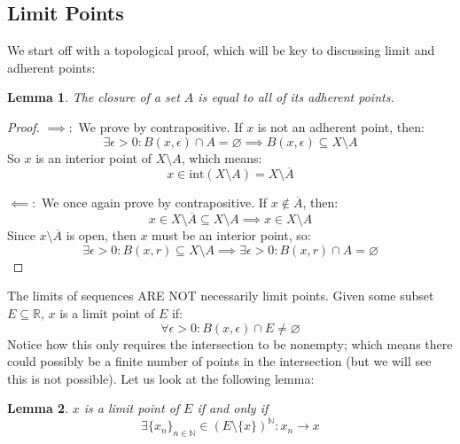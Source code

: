 \documentclass[10pt,letterpaper]{article} %
\newtheorem{lem}{Lemma}[section]
\begin{document}
\subsection{Limit Points}
We start off with a topological proof, which will be key to discussing limit and adherent points:
\begin{lem}
The closure of a set $A$ is equal to all of its adherent points. 
\end{lem}
\begin{proof}
$\implies:$ We prove by contrapositive. If $x$ is not an adherent point, then:
\begin{equation*}
\exists \epsilon > 0: B(x, \epsilon) \cap A = \varnothing \implies B(x, \epsilon) \subseteq X \setminus A
\end{equation*} 
So $x$ is an interior point of $X \setminus A$, which means:
\begin{equation*}
x \in \text{int}(X \setminus A) = X \setminus \overline{A}
\end{equation*} 

$\impliedby:$ We once again prove by contrapositive. If $x \notin \overline{A}$, then:
\begin{equation*}
x \in X \setminus \overline{A} \subseteq X \setminus A \implies x \in X \setminus A
\end{equation*}
Since $x \setminus \overline{A}$ is open, then $x$ must be an interior point, so:
\begin{equation*}
\exists \epsilon > 0: B(x, r) \subseteq X \setminus A \implies \exists \epsilon > 0: B(x, r) \cap A = \varnothing
\end{equation*}
\end{proof}
The limits of sequences ARE NOT necessarily limit points. Given some subset $E \subseteq \mathbb{R}$, $x$ is a limit point of $E$ if:
\begin{equation*}
\forall \epsilon > 0: B(x, \epsilon) \cap E \neq \varnothing
\end{equation*}
Notice how this only requires the intersection to be nonempty; which means there could possibly be a finite number of points in the intersection (but we will see this is not possible). Let us look at the following lemma:
\begin{lem}
$x$ is a limit point of $E$ if and only if
\begin{equation*}
\exists \{x_n\}_{n \in \mathbb{N}} \in (E \setminus \{x\})^\mathbb{N}: x_n \xrightarrow{} x
\end{equation*}
\end{lem}
\end{document}
